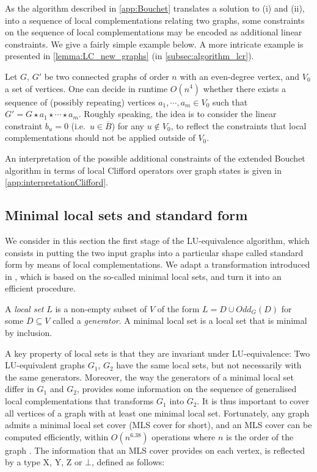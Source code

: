 \documentclass[a4paper,UKenglish,cleveref,autoref,thm-restate]{arxiv}
\newcommand{\se}{\subseteq}
\begin{document}
As the algorithm described in \cref{app:Bouchet} translates a solution to (i) and (ii), into a sequence of local complementations relating two graphs, some constraints on the sequence of local complementations may be encoded as additional linear constraints. We give a fairly simple example below. A more intricate example is presented in \cref{lemma:LC_new_graphs} (in \cref{subsec:algorithm_lcr}).

\begin{example} \label{ex:V0}
    Let $G$, $G'$ be two connected graphs of order $n$ with an even-degree vertex, and $V_0$ a set of vertices. One can decide in runtime $O(n^4)$ whether there exists a sequence of (possibly repeating) vertices $a_1, \cdots, a_m\in V_0 $ such that $G' = G \star a_1 \star \cdots \star a_m$. Roughly speaking, the idea is to consider the linear constraint $b_u=0$ (i.e.~$u\in   \overline B$) for any $u\notin V_0$, to reflect the constraints that local complementations should not be applied outside of $V_0$.
\end{example}

An interpretation of the possible additional constraints of the extended Bouchet algorithm in terms of local Clifford operators over graph states is given in \cref{app:interpretationClifford}.

\subsection{Minimal local sets and standard form} \label{subsec:mls}

We consider in this section the first stage of the LU-equivalence algorithm, which consists in putting the two input graphs into a particular shape called standard form by means of local complementations. We adapt a transformation introduced in \cite{claudet2024local}, which is based on the so-called minimal local sets, 
and turn it into an efficient procedure. 


\begin{definition} A \emph{local set} $L$ is a non-empty subset of $V$ of the form $L = D \cup Odd_G(D)$ for some $D \se V$ called a \emph{generator}. A minimal local set is a local set that is minimal by inclusion.
\end{definition}

A key property of local sets is that they are invariant under LU-equivalence: Two LU-equivalent graphs $G_1$, $G_2$ have the same local sets, but not necessarily with the same generators. Moreover, the way the generators of a minimal local set differ in $G_1$ and $G_2$, 
provides some information on the sequence of generalised local complementations that transforms $G_1$ into $G_2$. 
It is thus important to cover all vertices of a graph with at least one minimal local set. Fortunately, any graph admits a minimal local set cover (MLS cover for short), and an MLS cover can be computed efficiently, within   $O(n^{6.38})$ operations where $n$ is the order of the graph \cite{claudet2024covering}. The information that an MLS cover provides on each vertex, is reflected by a type X, Y, Z or $\bot$, defined as follows:
\end{document}
